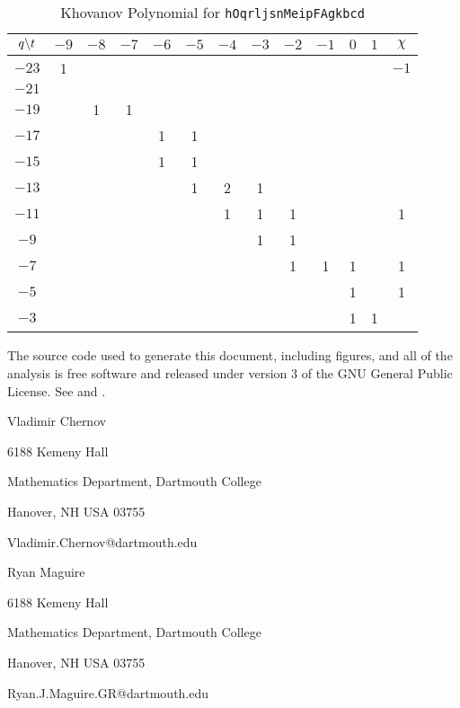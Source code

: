\documentclass{article}
\theoremstyle{plain}
\begin{document}
        \begin{table}
            \centering
            \begin{tabular}{| c | c | c | c | c | c | c | c | c | c | c | c | c |}
                \hline
                $q\symbol{92}t$&$-9$&$-8$&$-7$&$-6$&$-5$&$-4$&$-3$&$-2$&$-1$&$0$&$1$&$\chi$\\
                \hline
                $-23$&1&&&&&&&&&&&$-1$\\
                \hline
                $-21$&&&&&&&&&&&&\\
                \hline
                $-19$&&1&1&&&&&&&&&\\
                \hline
                $-17$&&&&1&1&&&&&&&\\
                \hline
                $-15$&&&&1&1&&&&&&&\\
                \hline
                $-13$&&&&&1&2&1&&&&&\\
                \hline
                $-11$&&&&&&1&1&1&&&&1\\
                \hline
                $-9$&&&&&&&1&1&&&&\\
                \hline
                $-7$&&&&&&&&1&1&1&&1\\
                \hline
                $-5$&&&&&&&&&&1&&1\\
                \hline
                $-3$&&&&&&&&&&1&1&\\
                \hline
            \end{tabular}
            \caption{Khovanov Polynomial for \texttt{hOqrljsnMeipFAgkbcd}}
        \end{table}
    \newpage
    
    
    \newpage
    The source code used to generate this document, including figures, and all
    of the analysis is free software and released under version 3 of the
    GNU General Public License. See
    \cite{mathematicsandphysics} and \cite{libtmpl}.
    \par\hfill\par
    Vladimir Chernov
    \par
    6188 Kemeny Hall
    \par
    Mathematics Department, Dartmouth College
    \par
    Hanover, NH USA 03755
    \par
    Vladimir.Chernov@dartmouth.edu
    \par\hfill\par
    Ryan Maguire
    \par
    6188 Kemeny Hall
    \par
    Mathematics Department, Dartmouth College
    \par
    Hanover, NH USA 03755
    \par
    Ryan.J.Maguire.GR@dartmouth.edu
\end{document}
